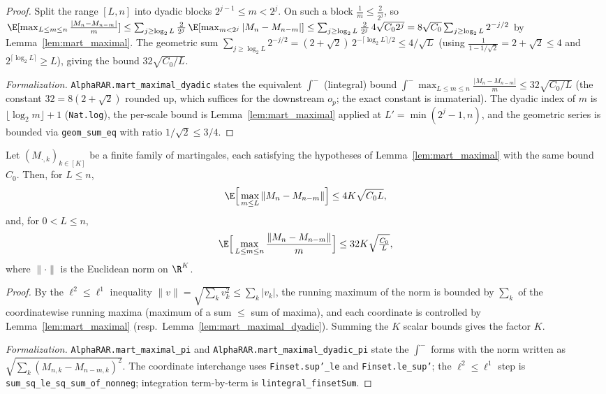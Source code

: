 \begin{proof}\leanok
{}
Split the range $[L,n]$ into dyadic blocks $2^{j-1} \le m < 2^j$. On such a block
$\frac1m \le \frac{2}{2^j}$, so
$\E[\max_{L\le m\le n}\frac{|M_n-M_{n-m}|}{m}]
 \le \sum_{j \ge \log_2 L} \frac{2}{2^j}\, \E[\max_{m<2^j}|M_n-M_{n-m}|]
 \le \sum_{j\ge\log_2 L} \frac{2}{2^j}\, 4\sqrt{C_0 2^j}
 = 8\sqrt{C_0}\sum_{j\ge\log_2 L} 2^{-j/2}$
by Lemma~\ref{lem:mart_maximal}. The geometric sum
$\sum_{j\ge\log_2 L} 2^{-j/2} = (2+\sqrt2)\,2^{-\lceil\log_2 L\rceil/2} \le 4/\sqrt L$
(using $\tfrac1{1-1/\sqrt2} = 2+\sqrt2 \le 4$ and $2^{\lceil\log_2 L\rceil}\ge L$), giving the bound
$32\sqrt{C_0/L}$.

\emph{Formalization.} \texttt{AlphaRAR.mart\_maximal\_dyadic} states the equivalent $\int^-$
(lintegral) bound $\int^- \max_{L\le m\le n}\frac{|M_n-M_{n-m}|}{m} \le 32\sqrt{C_0/L}$ (the
constant $32 = 8(2+\sqrt2)$ rounded up, which suffices for the downstream $o_p$; the exact
constant is immaterial). The dyadic index of $m$ is $\lfloor\log_2 m\rfloor+1$ (\texttt{Nat.log}),
the per-scale bound is Lemma~\ref{lem:mart_maximal} applied at $L' = \min(2^j-1,n)$, and the
geometric series is bounded via \texttt{geom\_sum\_eq} with ratio $1/\sqrt2 \le 3/4$.
\end{proof}

\begin{lemma}\label{lem:mart_maximal_pi}
\leanok
Let $(M_{\cdot,k})_{k\in[K]}$ be a finite family of martingales, each satisfying the hypotheses of
Lemma~\ref{lem:mart_maximal} with the same bound $C_0$. Then, for $L\le n$,
\[
  \E\Big[\max_{m\le L}\|M_n - M_{n-m}\|\Big] \le 4K\sqrt{C_0 L},
\]
and, for $0<L\le n$,
\[
  \E\Big[\max_{L\le m\le n}\frac{\|M_n - M_{n-m}\|}{m}\Big] \le 32K\sqrt{\tfrac{C_0}{L}},
\]
where $\|\cdot\|$ is the Euclidean norm on $\R^K$.
\end{lemma}

\begin{proof}\leanok
{}
By the $\ell^2\le\ell^1$ inequality $\|v\| = \sqrt{\sum_k v_k^2}\le\sum_k|v_k|$, the running maximum of
the norm is bounded by $\sum_k$ of the coordinatewise running maxima (maximum of a sum $\le$ sum of
maxima), and each coordinate is controlled by Lemma~\ref{lem:mart_maximal} (resp.\
Lemma~\ref{lem:mart_maximal_dyadic}). Summing the $K$ scalar bounds gives the factor $K$.

\emph{Formalization.} \texttt{AlphaRAR.mart\_maximal\_pi} and
\texttt{AlphaRAR.mart\_maximal\_dyadic\_pi} state the $\int^-$ forms with the norm written as
$\sqrt{\sum_k(M_{n,k}-M_{n-m,k})^2}$. The coordinate interchange uses \texttt{Finset.sup'\_le} and
\texttt{Finset.le\_sup'}; the $\ell^2\le\ell^1$ step is \texttt{sum\_sq\_le\_sq\_sum\_of\_nonneg};
integration term-by-term is \texttt{lintegral\_finsetSum}.
\end{proof}

